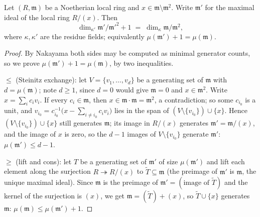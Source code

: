 \begin{theorem}
  \label{thm:cotangent_dim_drop}
  \leanok
  Let \((R, \mathfrak m)\) be a Noetherian local ring and
  \(x \in \mathfrak m \setminus \mathfrak m^2\). Write \(\mathfrak m'\) for the maximal
  ideal of the local ring \(R/(x)\). Then
  \[
    \dim_{\kappa'} \mathfrak m'/\mathfrak m'^2 + 1
      \;=\; \dim_{\kappa} \mathfrak m/\mathfrak m^2,
  \]
  where \(\kappa, \kappa'\) are the residue fields; equivalently
  \(\mu(\mathfrak m') + 1 = \mu(\mathfrak m)\).
\end{theorem}
\begin{proof}
  \leanok
  By Nakayama both sides may be computed as minimal generator counts, so we prove
  \(\mu(\mathfrak m') + 1 = \mu(\mathfrak m)\), by two inequalities.

  \(\leq\) (Steinitz exchange): let \(V = \{v_1, \dots, v_d\}\) be a generating set of
  \(\mathfrak m\) with \(d = \mu(\mathfrak m)\); note \(d \geq 1\), since \(d = 0\)
  would give \(\mathfrak m = 0\) and \(x \in \mathfrak m^2\). Write
  \(x = \sum_i c_i v_i\). If every \(c_i \in \mathfrak m\), then
  \(x \in \mathfrak m \cdot \mathfrak m = \mathfrak m^2\), a contradiction; so some
  \(c_{i_0}\) is a unit, and
  \(v_{i_0} = c_{i_0}^{-1}\bigl(x - \sum_{i \neq i_0} c_i v_i\bigr)\) lies in the span
  of \((V \setminus \{v_{i_0}\}) \cup \{x\}\). Hence
  \((V \setminus \{v_{i_0}\}) \cup \{x\}\) still generates \(\mathfrak m\); its image in
  \(R/(x)\) generates \(\mathfrak m' = \mathfrak m/(x)\), and the image of \(x\) is
  zero, so the \(d - 1\) images of \(V \setminus \{v_{i_0}\}\) generate
  \(\mathfrak m'\): \(\mu(\mathfrak m') \leq d - 1\).

  \(\geq\) (lift and cons): let \(T\) be a generating set of \(\mathfrak m'\) of size
  \(\mu(\mathfrak m')\) and lift each element along the surjection
  \(R \twoheadrightarrow R/(x)\) to \(\widetilde T \subseteq \mathfrak m\) (the
  preimage of \(\mathfrak m'\) is \(\mathfrak m\), the unique maximal ideal). Since
  \(\mathfrak m\) is the preimage of \(\mathfrak m' = (\text{image of } \widetilde T)\)
  and the kernel of the surjection is \((x)\), we get
  \(\mathfrak m = (\widetilde T) + (x)\), so \(\widetilde T \cup \{x\}\) generates
  \(\mathfrak m\): \(\mu(\mathfrak m) \leq \mu(\mathfrak m') + 1\).
\end{proof}

